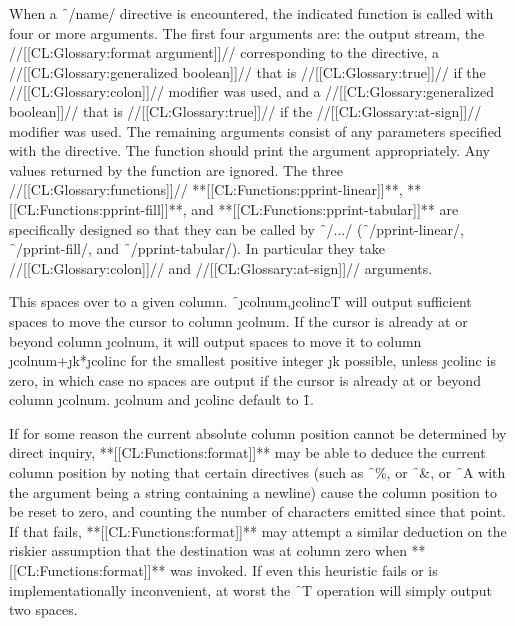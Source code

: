 When a \f{~/name/} directive is encountered, the indicated function is called with four or more arguments. The first four arguments are:
     the output stream,
     the //[[CL:Glossary:format argument]]// corresponding to the directive,
     a //[[CL:Glossary:generalized boolean]]// that is //[[CL:Glossary:true]]// if the //[[CL:Glossary:colon]]// modifier was used,
 and a //[[CL:Glossary:generalized boolean]]// that is //[[CL:Glossary:true]]// if the //[[CL:Glossary:at-sign]]// modifier was used. The remaining arguments consist of any parameters specified with the directive. The function should print the argument appropriately. Any values returned by the function are ignored.
  The three //[[CL:Glossary:functions]]// 
      **[[CL:Functions:pprint-linear]]**,
      **[[CL:Functions:pprint-fill]]**,
  and **[[CL:Functions:pprint-tabular]]** are specifically designed so that they can be called by \f{~/.../} (\ie \f{~/pprint-linear/}, \f{~/pprint-fill/}, and \f{~/pprint-tabular/}). In particular they take //[[CL:Glossary:colon]]// and //[[CL:Glossary:at-sign]]// arguments.

\endsubsubsection%

\endsubsection%


 

This spaces over to a given column. \f{~\j{colnum},\j{colinc}T} will output sufficient spaces to move the cursor to column \j{colnum}.  If the cursor is already at or beyond column \j{colnum}, it will output spaces to move it to column \j{colnum}+\j{k}*\j{colinc} for the smallest positive integer \j{k} possible, unless \j{colinc} is zero, in which case no spaces are output if the cursor is already at or beyond column \j{colnum}. \j{colnum} and \j{colinc} default to \f{1}.

If for some reason the current absolute column position cannot be determined by direct inquiry, **[[CL:Functions:format]]**  may be able to deduce the current column position by noting          that certain directives (such as \f{~\%}, or \f{~\&}, or \f{~A}  with the argument being a string containing a newline) cause the column position to be reset to zero, and counting the number of characters emitted since that point.  If that fails, **[[CL:Functions:format]]**  may attempt a similar deduction on the riskier assumption that the destination was at column zero when **[[CL:Functions:format]]**  was invoked.  If even this heuristic fails or is implementationally inconvenient, at worst the \f{~T} operation will simply output two spaces.


